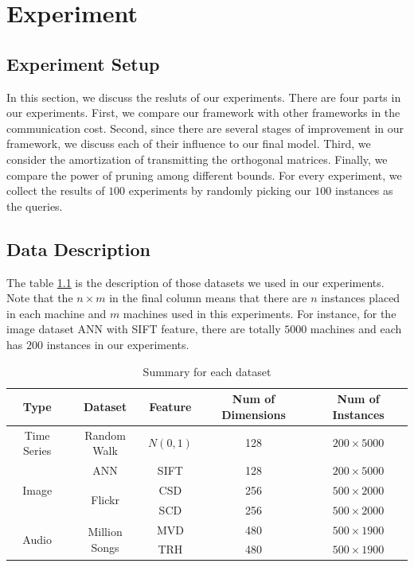 \chapter{Experiment}
\label{c:exp}

\section{Experiment Setup} %
\label{s:experiment_setup}

In this section, we discuss the resluts of our experiments.  There are four parts in our experiments.  First, we compare our framework with other frameworks in the communication cost.  Second, since there are several stages of improvement in our framework, we discuss each of their influence to our final model.  Third, we consider the amortization of transmitting the orthogonal matrices.  Finally, we compare the power of pruning among different bounds.  For every experiment, we collect the results of $100$ experiments by randomly picking our $100$ instances as the queries.

\section{Data Description} %
\label{s:data_description}

The table \ref{table:datasets} is the description of those datasets we used in our experiments. Note that the $n\times m$ in the final column means that there are $n$ instances placed in each machine and $m$ machines used in this experiments.  For instance, for the image dataset ANN with SIFT feature, there are totally $5000$ machines and each has $200$ instances in our experiments.

\begin{table}[htpb]\begin{center}
\caption{Summary for each dataset}\label{table:datasets}
\begin{tabular}{|c|c|c|c|c|}
\hline 
Type & Dataset & Feature & Num of Dimensions & Num of Instances\\ \hline \hline
Time Series & Random Walk & $N(0,1)$ & 128 & $200\times 5000$\\ \hline
\multirow{3}{*}{Image} & ANN & SIFT & 128 & $200\times 5000$\\ 
\cline{2-5}
 & \multirow{2}{*}{Flickr} & CSD & 256 & $500\times 2000$\\ 
\cline{3-5}
 & & SCD & 256 & $500\times 2000$\\ \hline
 \multirow{2}{*}{Audio} & \multirow{2}{*}{Million Songs} & MVD & 480 & $500\times 1900$ \\ 
 \cline{3-5}
 & & TRH & 480 & $500\times 1900$\\ \hline
\end{tabular}
\end{center}\end{table}

